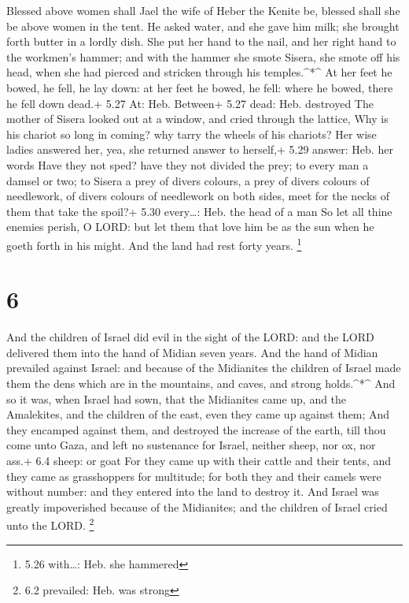  Blessed above women shall Jael the wife of Heber the
Kenite be, blessed shall she be above women in the tent. 
He asked water, and she gave him milk; she brought forth butter in a
lordly dish.  She put her hand to the nail, and her right
hand to the workmen's hammer; and with the hammer she smote Sisera, she
smote off his head, when she had pierced and stricken through his
temples.\^{}*\^{}  At her feet he bowed, he fell, he lay
down: at her feet he bowed, he fell: where he bowed, there he fell down
dead.+ 5.27 At: Heb. Between+ 5.27 dead: Heb. destroyed 
The mother of Sisera looked out at a window, and cried through the
lattice, Why is his chariot so long in coming? why tarry the wheels of
his chariots?  Her wise ladies answered her, yea, she
returned answer to herself,+ 5.29 answer: Heb. her words 
Have they not sped? have they not divided the prey; to every man a
damsel or two; to Sisera a prey of divers colours, a prey of divers
colours of needlework, of divers colours of needlework on both sides,
meet for the necks of them that take the spoil?+ 5.30 every\ldots: Heb.
the head of a man  So let all thine enemies perish, O LORD:
but let them that love him be as the sun when he goeth forth in his
might. And the land had rest forty years. \footnote{5.26 with\ldots:
  Heb. she hammered}

\hypertarget{section-5}{%
\section{6}\label{section-5}}

 And the children of Israel did evil in the sight of the
LORD: and the LORD delivered them into the hand of Midian seven years.
 And the hand of Midian prevailed against Israel: and
because of the Midianites the children of Israel made them the dens
which are in the mountains, and caves, and strong holds.\^{}*\^{}
 And so it was, when Israel had sown, that the Midianites
came up, and the Amalekites, and the children of the east, even they
came up against them;  And they encamped against them, and
destroyed the increase of the earth, till thou come unto Gaza, and left
no sustenance for Israel, neither sheep, nor ox, nor ass.+ 6.4 sheep: or
goat  For they came up with their cattle and their tents,
and they came as grasshoppers for multitude; for both they and their
camels were without number: and they entered into the land to destroy
it.  And Israel was greatly impoverished because of the
Midianites; and the children of Israel cried unto the LORD. \footnote{6.2
  prevailed: Heb. was strong}

